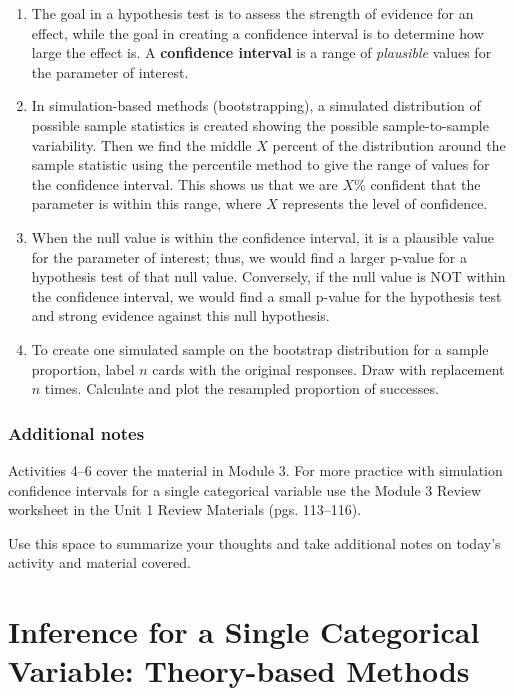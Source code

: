 \documentclass[
]{report}
\begin{document}
\begin{enumerate}
\def\labelenumi{\arabic{enumi}.}
\item
  The goal in a hypothesis test is to assess the strength of evidence for an effect, while the goal in creating a confidence interval is to determine how large the effect is. A \textbf{confidence interval} is a range of \emph{plausible} values for the parameter of interest.
\item
  In simulation-based methods (bootstrapping), a simulated distribution of possible sample statistics is created showing the possible sample-to-sample variability. Then we find the middle \(X\) percent of the distribution around the sample statistic using the percentile method to give the range of values for the confidence interval. This shows us that we are \(X\)\% confident that the parameter is within this range, where \(X\) represents the level of confidence.
\item
  When the null value is within the confidence interval, it is a plausible value for the parameter of interest; thus, we would find a larger p-value for a hypothesis test of that null value. Conversely, if the null value is NOT within the confidence interval, we would find a small p-value for the hypothesis test and strong evidence against this null hypothesis.
\item
  To create one simulated sample on the bootstrap distribution for a sample proportion, label \(n\) cards with the original responses. Draw with replacement \(n\) times. Calculate and plot the resampled proportion of successes.
\end{enumerate}

\subsection{Additional notes}\label{additional-notes-5}

Activities 4--6 cover the material in Module 3. For more practice with simulation confidence intervals for a single categorical variable use the Module 3 Review worksheet in the Unit 1 Review Materials (pgs. 113--116).

Use this space to summarize your thoughts and take additional notes on today's activity and material covered.

\newpage

\chapter{Inference for a Single Categorical Variable: Theory-based Methods}\label{inference-for-a-single-categorical-variable-theory-based-methods}
\end{document}

